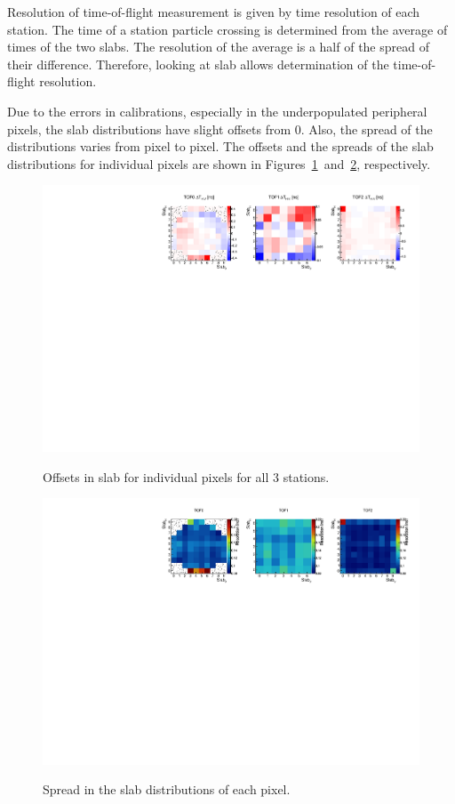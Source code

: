 Resolution of time-of-flight measurement is given by time resolution
of each station. The time of a station particle crossing is determined
from the average of times of the two slabs. The resolution of the
average is a half of the spread of their difference. Therefore,
looking at slab \DT{} allows determination of the time-of-flight
resolution.

Due to the errors in calibrations, especially in the underpopulated
peripheral pixels, the slab \DT{} distributions have slight offsets
from 0. Also, the spread of the distributions varies from pixel to
pixel. The offsets and the spreads of the slab \DT{} distributions for
individual pixels are shown in
Figures~\ref{fig:SlabDToffsetByPixel}~and~\ref{fig:SlabDTresByPixel},
respectively.


\begin{figure}
  \begin{center}
  \includegraphics[width=0.9\columnwidth]{05_slab_dt_offset_by_pixel_2d} \\
  \caption{Offsets in slab \DT{} for individual pixels for all 3 stations.}
  \label{fig:SlabDToffsetByPixel}
  \end{center}
\end{figure}


\begin{figure}
  \begin{center}
  \includegraphics[width=0.9\columnwidth]{06_slab_dt_resolution_by_pixel_2d} \\
  \caption{Spread in the slab \DT{} distributions of each pixel.}
  \label{fig:SlabDTresByPixel}
  \end{center}
\end{figure}

